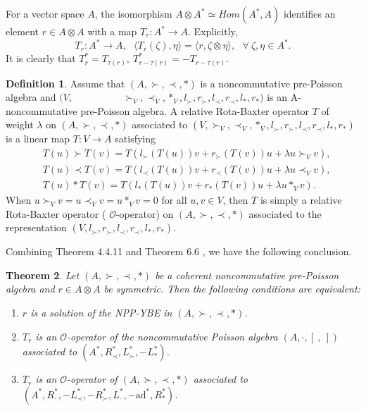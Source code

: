 \documentclass[12pt]{amsart}
\newtheorem{thm}{Theorem}[section]
\theoremstyle{definition}
\newtheorem{defi}[thm]{Definition}
\begin{document}
For a vector space $A$, the isomorphism $A\otimes A^{*}\simeq Hom (A^{*},A)$ identifies an element $r\in A\otimes A$ with a map
$T_{r}:A^{*}\longrightarrow A$. Explicitly, 
\begin{equation} \label{Op1} T_{r}:A^{*}\longrightarrow A,\ \ \  \langle T_{r}(\zeta),\eta\rangle=\langle r,\zeta\otimes\eta\rangle,
\ \ \ \forall~\zeta,\eta\in A^{*}.\end{equation}
It is clearly that $T_{r}^{*}=T_{\tau(r)},~T_{r-\tau(r)}^{*}=-T_{r-\tau(r)}$.

\begin{defi} Assume that $(A,\succ,\prec,\ast)$ is a noncommutative pre-Poisson algebra and $(V, $\ \ \ \ \ \ \ \ \ \ $ \succ_V,\prec_V,\ast_V,l_{\succ},r_{\succ},l_{\prec},r_{\prec},l_{\ast},r_{\ast})$ is
 an A-noncommutative pre-Poisson algebra.
A relative Rota-Baxter operator $T$ of weight $\lambda$ on $(A,\succ,\prec,\ast)$ associated to
$(V,\succ_V,\prec_V,\ast_V,l_{\succ},r_{\succ},l_{\prec},r_{\prec},l_{\ast},r_{\ast})$
   is a linear map $T:V\longrightarrow A$ satisfying
\begin{align*}&T(u)\succ T(v)=T (l_{\succ}(T(u))v+r_{\succ}(T(v))u+\lambda u\succ_V v),\\&
T(u)\prec T(v)=T (l_{\prec}(T(u))v+r_{\prec}(T(v))u+\lambda u\prec_V v),\\&
T(u)\ast T(v)=T (l_{\ast}(T(u))v+r_{\ast}(T(v))u+\lambda u\ast_V v).
\end{align*}
 When $u\succ_Vv=u\prec_Vv=u\ast_Vv=0$ for all $u,v\in V$, then $T$ is simply a relative Rota-Baxter operator ( $\mathcal O$-operator) on
$(A,\succ,\prec,\ast)$ associated to the representation $(V,l_{\succ},r_{\succ},l_{\prec},r_{\prec},l_{\ast},r_{\ast})$.
\end{defi}

Combining Theorem 4.4.11 \cite{B2} and Theorem 6.6 \cite{B1}, we have the following conclusion.

\begin{thm} \label{Opp} Let $(A,\succ,\prec,\ast)$ be a coherent noncommutative pre-Poisson algebra and
$r\in A\otimes A$ be symmetric. Then the following conditions are equivalent:
\begin{enumerate}
		\item $r$ is a solution of the NPP-YBE in $(A,\succ,\prec,\ast)$.
 \item $T_r$
is an $\mathcal O$-operator of the noncommutative Poisson algebra $(A, \cdot, [ \ , \ ])$ associated to
 $(A^{*}, R_{\prec}^{*}, L_{\succ}^{*},-L_{\ast}^{*})$.
\item $T_r$
is an $\mathcal O$-operator of $(A,\succ,\prec,\ast)$ associated to 
$(A^{*},R_{\cdot}^{*},-L_{\prec}^{*},-R_{\succ}^{*},L_{\cdot}^{*},-\mathrm{ad}^{*},R^{*}_{\ast})$.
\end{enumerate}
\end{thm}
\end{document}
